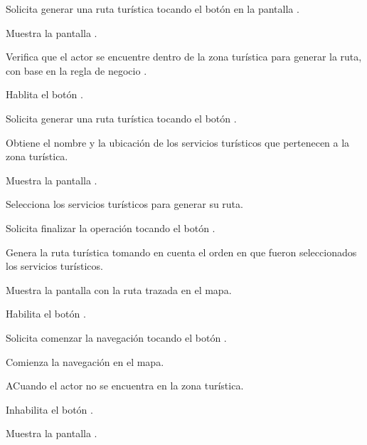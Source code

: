 	\begin{UCtrayectoria} 
		\UCpaso [\UCactor] Solicita generar una ruta turística tocando el botón  en la pantalla .
		
		\UCpaso Muestra la pantalla .
		
		\UCpaso Verifica que el actor se encuentre dentro de la zona turística para generar la ruta, con base en la regla de negocio . 
		
		\UCpaso Hablita el botón \IUGenerarRuta{}.
		
		\UCpaso [\UCactor] Solicita generar una ruta turística tocando el botón \IUGenerarRuta{}. 
		
		\UCpaso Obtiene el nombre y la ubicación de los servicios turísticos que pertenecen a la zona turística.
		
		\UCpaso Muestra la pantalla .
		
		\UCpaso [\UCactor] Selecciona los servicios turísticos para generar su ruta.
		
		\UCpaso [\UCactor] Solicita finalizar la operación tocando el botón . 
		
		\UCpaso Genera la ruta turística tomando en cuenta el orden en que fueron seleccionados los servicios turísticos. 
		
		\UCpaso Muestra la pantalla  con la ruta trazada en el mapa.
		
		\UCpaso Habilita el botón .
		
		\UCpaso [\UCactor] Solicita comenzar la navegación tocando el botón . 
		
		\UCpaso Comienza la navegación en el mapa.
		
	\end{UCtrayectoria}

	\begin{UCtrayectoriaA}{A}{Cuando el actor no se encuentra en la zona turística.}
		
		\UCpaso Inhabilita el botón \IUGenerarRuta{}.
		
		\UCpaso Muestra la pantalla .
		
	\end{UCtrayectoriaA}


